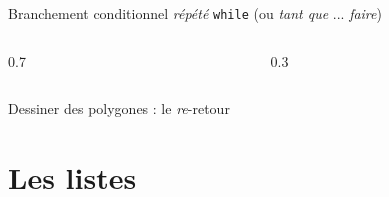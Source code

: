 \documentclass{beamer}
\begin{document}
\begin{frame}{Branchement conditionnel \emph{répété} \texttt{while} (ou \emph{tant que} ... \emph{faire})}
\begin{columns}
\begin{column}{0.7\textwidth}
{%



}
\end{column}
\begin{column}{0.3\textwidth}
  \end{column}
  \end{columns}
\end{frame}

\begin{frame}{Dessiner des polygones : le \emph{re}-retour}

\pause

\bigskip

\end{frame}

\section{Les listes}
\end{document}
